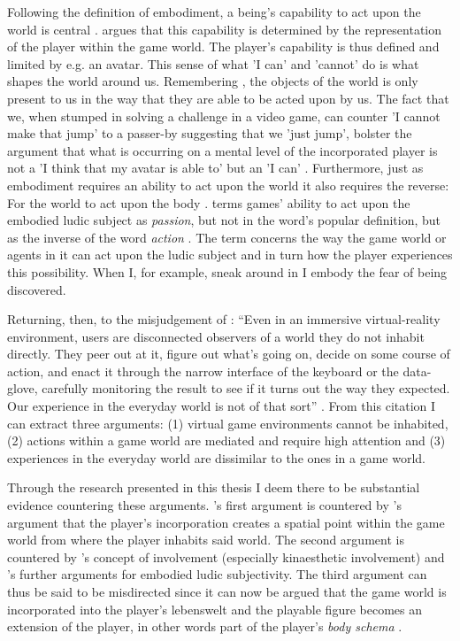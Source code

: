 Following the definition of embodiment, a being's capability to act upon the world is central \cite{ponty}.  argues that this capability is determined by the representation of the player within the game world. The player's capability is thus defined and limited by e.g. an avatar. This sense of what 'I can' and 'cannot' do is what shapes the world around us. Remembering , the objects of the world is only present to us in the way that they are able to be acted upon by us. The fact that we, when stumped in solving a challenge in a video game, can counter 'I cannot make that jump' to a passer-by suggesting that we 'just jump', bolster the argument that what is occurring on a mental level of the incorporated player is not a 'I think that my avatar is able to' but an 'I can' \cite{vellashort}. Furthermore, just as embodiment requires an ability to act upon the world it also requires the reverse: For the world to act upon the body \cite{ponty}.  terms games' ability to act upon the embodied ludic subject as \textit{passion}, but not in the word's popular definition, but as the inverse of the word \textit{action} \cite{vella}. The term concerns the way the game world or agents in it can act upon the ludic subject and in turn how the player experiences this possibility. When I, for example, sneak around in  I embody the fear of being discovered.

Returning, then, to the misjudgement of : ``Even in an immersive virtual-reality environment, users are disconnected observers of a world they do not inhabit directly. They peer out at it, figure out what’s going on, decide on some course of action, and enact it through the narrow interface of the keyboard or the data-glove, carefully monitoring the result to see if it turns out the way they expected. Our experience in the everyday world is not of that sort'' \cite[p. 102]{dourish}. From this citation I can extract three arguments: (1) virtual game environments cannot be inhabited, (2) actions within a game world are mediated and require high attention and (3) experiences in the everyday world are dissimilar to the ones in a game world.

Through the research presented in this thesis I deem there to be substantial evidence countering these arguments. \citeauthor{dourish}'s \citeyear{dourish} first argument is countered by \citeauthor{vella}'s argument that the player's incorporation \cite{calleja} creates a spatial point within the game world from where the player inhabits said world. The second argument is countered by \citeauthor{calleja}'s \citeyear{calleja} concept of involvement (especially kinaesthetic involvement) and \citeauthor{vella}'s \citeyear{vella} further arguments for embodied ludic subjectivity. The third argument can thus be said to be misdirected since it can now be argued that the game world is incorporated into the player's lebenswelt and the playable figure becomes an extension of the player, in other words part of the player's \textit{body schema} \cite{vellashort} \cite{haans}.
